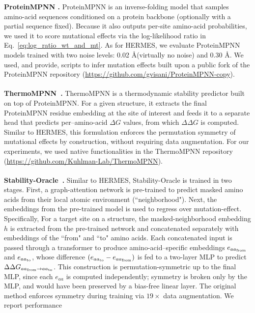 \noindent \textbf{ProteinMPNN \citep{dauparas_robust_2022}.} ProteinMPNN is an inverse-folding model
that samples amino-acid sequences conditioned on a protein backbone (optionally with a partial
sequence fixed). Because it also outputs per-site amino-acid probabilities, we used it to score
mutational effects via the log-likelihood ratio in Eq.~\ref{eq:log_ratio_wt_and_mt}. As for HERMES,
we evaluate ProteinMPNN models trained with two noise levels: 0.02 \AA (virtually no noise) and 0.30
\AA. We used, and provide, scripts to infer mutation effects built upon a public fork of the
ProteinMPNN repository (\url{https://github.com/gvisani/ProteinMPNN-copy}).\\
\\
\noindent\textbf{ThermoMPNN~\citep{dieckhaus_transfer_2024}.} ThermoMPNN is a thermodynamic
stability predictor built on top of ProteinMPNN. For a given structure, it extracts the final
ProteinMPNN residue embedding at the site of interest and feeds it to a separate head that predicts
per–amino-acid $\Delta G$ values, from which $\Delta\Delta G$ is computed. Similar to HERMES, this
formulation enforces the permutation symmetry of mutational effects by construction, without
requiring data augmentation. For our experiments, we used native functionalities in the ThermoMPNN
repository (\url{https://github.com/Kuhlman-Lab/ThermoMPNN}). \\
\\
\noindent \textbf{Stability-Oracle~\citep{diaz_stability_2024}.} Similar to HERMES, Stability-Oracle
is trained in two stages. First, a graph-attention network is pre-trained to predict masked amino
acids from their local atomic environment (``neighborhood"). Next, the embeddings from the
pre-trained model is used to regress over mutation-effect. Specifically, For a target site on a
structure, the masked-neighborhood embedding $h$ is extracted from the pre-trained network and
concatenated separately with embeddings of the ``from" and ``to" amino acids. Each concatenated
input is passed through a transformer to produce amino-acid–specific embeddings $e_{aa_{{\text{from}}}}$ and
$e_{aa_{{\text{to}}}}$, whose difference $(e_{aa_{{\text{to}}}}-e_{aa_{{\text{from}}}})$ is fed to a two-layer MLP to
predict $\Delta\Delta G_{aa_{{\text{from}}}\rightarrow aa_{{\text{to}}}}$. This construction is
permutation-symmetric up to the final MLP, since each $e_{aa}$ is computed independently; symmetry
is broken only by the MLP, and would have been preserved by a bias-free linear layer. The original
method enforces symmetry during training via $19\times$ data augmentation. We report performance
